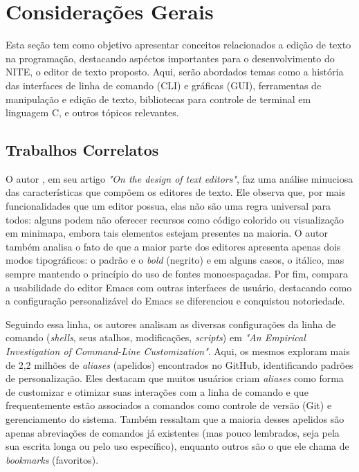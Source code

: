 \chapter{Considerações Gerais}
\label{cap:02}

Esta seção tem como objetivo apresentar conceitos relacionados a
edição de texto na programação, destacando aspéctos importantes para
o desenvolvimento do NITE, o editor de texto proposto. Aqui, serão abordados
temas como a história das interfaces de linha de comando (CLI) e gráficas (GUI),
ferramentas de manipulação e edição de texto, bibliotecas para controle de
terminal em linguagem C, e outros tópicos relevantes.

\section{Trabalhos Correlatos}

O autor \cite{Rougier2020Editors}, em seu artigo \textit{"On the design of text editors"}, faz uma
análise minuciosa das características que compõem os editores de texto. Ele observa que,
por mais funcionalidades que um editor possua, elas não são uma regra universal para todos:
alguns podem não oferecer recursos como código colorido ou visualização em minimapa, embora
tais elementos estejam presentes na maioria. O autor também analisa o fato de que a maior
parte dos editores apresenta apenas dois modos tipográficos: o padrão e o \textit{bold}
(negrito) e em alguns casos, o itálico,  mas sempre mantendo o princípio do uso de fontes
monoespaçadas. Por fim, compara a usabilidade do editor Emacs \cite{Stallman1981} com outras
interfaces de usuário, destacando como a configuração personalizável do Emacs se diferenciou e
conquistou notoriedade.

Seguindo essa linha, os autores \cite{SchroderCito2022} analisam as diversas configurações da linha
de comando (\textit{shells}, seus atalhos, modificações, \textit{scripts}) em \textit{"An Empirical
Investigation of Command-Line Customization"}. Aqui, os mesmos exploram mais de 2,2 milhões de \textit{aliases}
(apelidos) encontrados no GitHub, identificando padrões de personalização. Eles destacam que muitos usuários criam
\textit{aliases} como forma de customizar e otimizar suas interações com a linha de comando e que
frequentemente estão associados a comandos como controle de versão (Git) e gerenciamento do sistema. Também
ressaltam que a maioria desses apelidos são apenas abreviações de comandos já existentes (mas pouco lembrados,
seja pela sua escrita longa ou pelo uso específico), enquanto outros são o que ele chama de
\textit{bookmarks} (favoritos).

